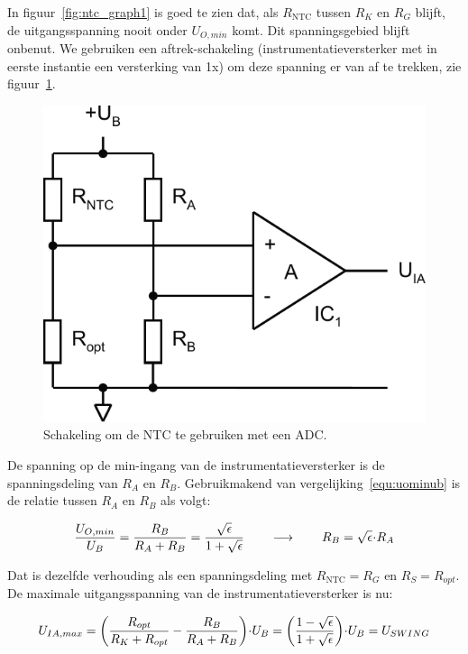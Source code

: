 \documentclass[12pt,a4paper,final,twoside,fleqn]{article}
\newcommand{\rntc}{R_\text{NTC}}
\newcommand{\ropt}{R_{opt}}
\let\oldcdot\cdot
\renewcommand{\cdot}{\kern-.10em\oldcdot\kern-.10em}
\begin{document}
In figuur~\ref{fig:ntc_graph1} is goed te zien dat, als $\rntc$ tussen $R_K$ en
$R_G$ blijft, de uitgangsspanning nooit onder $U_{O,min}$ komt. Dit spanningsgebied
blijft onbenut. We gebruiken een aftrek-schakeling (instrumentatieversterker met in
eerste instantie een versterking van 1x) om deze spanning er van af te trekken, zie
figuur~\ref{fig:ntc_ampli}.

\begin{figure}[ht!]
\centering
\includegraphics[scale=0.63]{drawings/ntc_ampli}
\caption{Schakeling om de NTC te gebruiken met een ADC.}
\label{fig:ntc_ampli}
\end{figure}


De spanning op de min-ingang van de instrumentatieversterker is de spanningsdeling
van $R_A$ en $R_B$. Gebruikmakend van vergelijking~\eqref{equ:uominub} is de relatie
tussen $R_A$ en $R_B$ als volgt:

\begin{equation}
\dfrac{U_{O,min}}{U_B} = \dfrac{R_B}{R_A+R_B} = \dfrac{\sqrt{\epsilon}}{1+\sqrt{\epsilon}} \qquad\longrightarrow\qquad R_B = \sqrt{\epsilon}\cdot R_A
\end{equation}

Dat is dezelfde verhouding als een spanningsdeling met $\rntc = R_G$ en
$R_S = \ropt$.
De maximale uitgangsspanning van de instrumentatieversterker is nu:

\begin{equation}
U_{IA,max} = \left( \dfrac{\ropt}{R_K+\ropt} - \dfrac{R_B}{R_A+R_B}\right)\cdot U_B =
\left(\dfrac{1-\sqrt{\epsilon}}{1+\sqrt{\epsilon}}\right)\cdot U_B = U_{SWING}
\end{equation}
\end{document}
